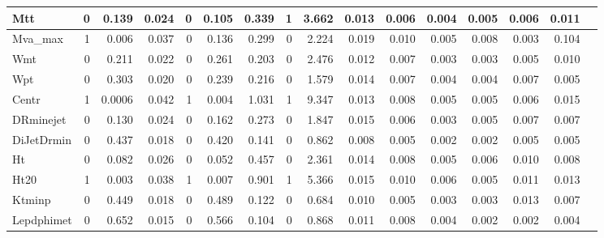 \begin{sidewaystable}[htbp]
\begin{tabular}{|l|r|r|r|r|r|r|r|r|r|r|r|r|r|r|r|}
\textsf{Mtt} & 0 & 0.139 & 0.024 & 0 & 0.105 & 0.339 & 1 & 3.662 & 0.013 & 0.006 & 0.004 & 0.005 & 0.006 & 0.011 \\ \hline
\textsf{Mva\_max} & 1 & 0.006 & 0.037 & 0 & 0.136 & 0.299 & 0 & 2.224 & 0.019 & 0.010 & 0.005 & 0.008 & 0.003 & 0.104 \\ \hline
\textsf{Wmt} & 0 & 0.211 & 0.022 & 0 & 0.261 & 0.203 & 0 & 2.476 & 0.012 & 0.007 & 0.003 & 0.003 & 0.005 & 0.010 \\ \hline
\textsf{Wpt} & 0 & 0.303 & 0.020 & 0 & 0.239 & 0.216 & 0 & 1.579 & 0.014 & 0.007 & 0.004 & 0.004 & 0.007 & 0.005 \\ \hline
\textsf{Centr} & 1 & 0.0006 & 0.042 & 1 & 0.004 & 1.031 & 1 & 9.347 & 0.013 & 0.008 & 0.005 & 0.005 & 0.006 & 0.015 \\ \hline
\textsf{DRminejet} & 0 & 0.130 & 0.024 & 0 & 0.162 & 0.273 & 0 & 1.847 & 0.015 & 0.006 & 0.003 & 0.005 & 0.007 & 0.007 \\ \hline
\textsf{DiJetDrmin} & 0 & 0.437 & 0.018 & 0 & 0.420 & 0.141 & 0 & 0.862 & 0.008 & 0.005 & 0.002 & 0.002 & 0.005 & 0.005 \\ \hline
\textsf{Ht} & 0 & 0.082 & 0.026 & 0 & 0.052 & 0.457 & 0 & 2.361 & 0.014 & 0.008 & 0.005 & 0.006 & 0.010 & 0.008 \\ \hline
\textsf{Ht20} & 1 & 0.003 & 0.038 & 1 & 0.007 & 0.901 & 1 & 5.366 & 0.015 & 0.010 & 0.006 & 0.005 & 0.011 & 0.013 \\ \hline
\textsf{Ktminp} & 0 & 0.449 & 0.018 & 0 & 0.489 & 0.122 & 0 & 0.684 & 0.010 & 0.005 & 0.003 & 0.003 & 0.013 & 0.007 \\ \hline
\textsf{Lepdphimet} & 0 & 0.652 & 0.015 & 0 & 0.566 & 0.104 & 0 & 0.868 & 0.011 & 0.008 & 0.004 & 0.002 & 0.002 & 0.004 \\ \hline
\end{tabular}
\label{tab:muoYD4jetStats}
\end{sidewaystable}